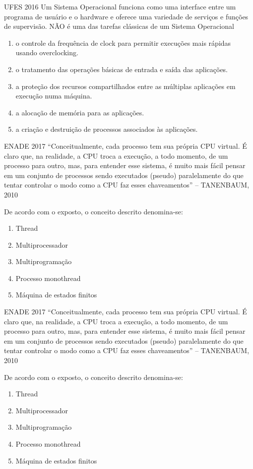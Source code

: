 \documentclass[aspectratio=169,
				xcolor=table]{beamer}
\begin{document}
	\begin{frame}{UFES 2016}
		Um Sistema Operacional funciona como uma interface entre um programa de usuário e o hardware e oferece uma variedade de serviços e funções de supervisão. NÃO é uma das tarefas clássicas de um Sistema Operacional 
		\begin{enumerate}[a]
			\item \alert{o controle da frequência de clock para permitir execuções mais rápidas usando overclocking. }
			\item o tratamento das operações básicas de entrada e saída das aplicações. 
			\item a proteção dos recursos compartilhados entre as múltiplas aplicações em execução numa máquina. 
			\item a alocação de memória para as aplicações. 
			\item a criação e destruição de processos associados às aplicações.			
		\end{enumerate}
	\end{frame}
	
	
	\begin{frame}{ENADE 2017}
		“Conceitualmente, cada processo tem sua própria CPU virtual. É claro que, na realidade, a CPU troca a execução, a todo momento, de um processo para outro, mas, para entender esse sistema, é muito mais fácil pensar em um conjunto de processos sendo executados (pseudo) paralelamente do que tentar controlar o modo como a CPU faz esses chaveamentos” – TANENBAUM, 2010
	
		De acordo com o exposto, o conceito descrito denomina-se:
		\begin{enumerate}[a]
			\item Thread
			\item Multiprocessador 
			\item Multiprogramação 
			\item Processo monothread
			\item Máquina de estados finitos			
		\end{enumerate}
	\end{frame}
	
	\begin{frame}{ENADE 2017}
		“Conceitualmente, cada processo tem sua própria CPU virtual. É claro que, na realidade, a CPU troca a execução, a todo momento, de um processo para outro, mas, para entender esse sistema, é muito mais fácil pensar em um conjunto de processos sendo executados (pseudo) paralelamente do que tentar controlar o modo como a CPU faz esses chaveamentos” – TANENBAUM, 2010
	
		De acordo com o exposto, o conceito descrito denomina-se:
		\begin{enumerate}[a]
			\item Thread
			\item Multiprocessador 
			\item \alert{Multiprogramação }
			\item Processo monothread
			\item Máquina de estados finitos			
		\end{enumerate}
	\end{frame}
\end{document}
